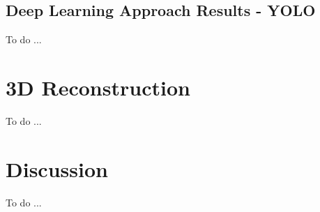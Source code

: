 \subsection{Deep Learning Approach Results - YOLO}\label{subsec:yolo_obj_det_results}
To do ...


\section{3D Reconstruction}\label{sec:exp_3d_reconstruction}
To do ...

\section{Discussion}\label{sec:exp_discussion}
To do ...